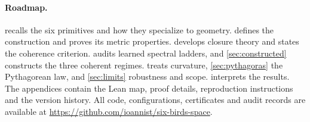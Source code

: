 \paragraph{Roadmap.}
 recalls the six primitives and how they specialize to geometry.
 defines the construction and proves its metric properties.
 develops closure theory and states the coherence criterion.
 audits learned spectral ladders, and \cref{sec:constructed} constructs the three coherent regimes.
 treats curvature, \cref{sec:pythagoras} the Pythagorean law, and \cref{sec:limits} robustness and scope.
 interprets the results.
The appendices contain the Lean map, proof details, reproduction instructions and the version history.
All code, configurations, certificates and audit records are available at \url{https://github.com/ioannist/six-birds-space}.
